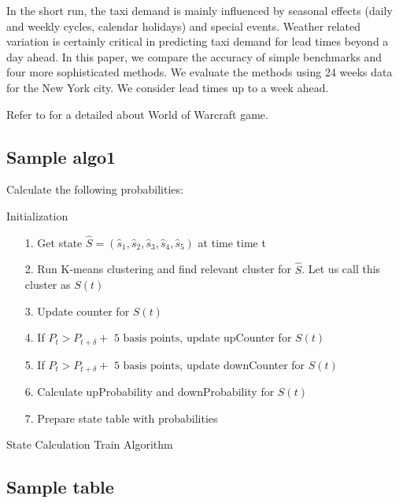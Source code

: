 \documentclass[10pt, reqno]{amsart}
\begin{document}
In the short run, the taxi demand is mainly influenced by seasonal effects (daily and weekly cycles, calendar holidays) and special events. Weather related variation is certainly critical in predicting taxi demand for lead times beyond a day ahead. In this paper, we compare the accuracy of simple benchmarks and four more sophisticated methods. We evaluate the methods using 24 weeks data for the New York city. We consider lead times up to a week ahead.

Refer to \cite{Nery1} for a detailed about World of Warcraft game. 




\subsection{Sample algo1}

Calculate the following probabilities:

\begin{algorithm}[H] \label{TrainAlgo1}
 Initialization \;
 
 \begin{itemize}
 \item[1.] Get state $\hat{S} = (\hat{s}_1, \hat{s}_2, \hat{s}_3, \hat{s}_4, \hat{s}_5)$  at time time t\;
 \item[2.] Run K-means clustering and find relevant cluster for $\hat{S}$. Let us call this cluster as $S(t)$ \;
 \item[3.] Update counter for $S(t)$
 \item[4.] If $P_t > P_{t+\delta} + \mbox{ 5 basis points} $, update upCounter for $S(t)$\;
 \item[5.] If $P_t > P_{t+\delta} + \mbox{ 5 basis points} $, update downCounter for $S(t)$\;
 \item[6.] Calculate upProbability and downProbability for $S(t)$ \;
 \item[7.] Prepare state table with probabilities 
 \end{itemize}

 \caption{State Calculation Train Algorithm}
\end{algorithm}


\subsection{Sample table}
\end{document}
